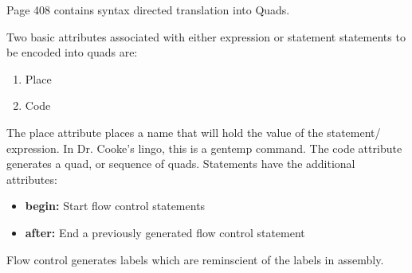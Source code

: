 Page 408 contains syntax directed translation into Quads.

Two basic attributes associated with either expression or statement statements to be encoded into quads are:
\begin{enumerate}
\item Place 
\item Code
\end{enumerate}
 The place attribute places a name that will hold the value of the statement/ expression.  In Dr. Cooke's lingo, this is a gentemp command.    The code attribute generates a quad, or sequence of quads.  
Statements have the additional attributes:
\begin{itemize}
\item \textbf{begin:}  Start flow control statements
\item \textbf{after:}   End a previously generated flow control statement
\end{itemize}
Flow control generates labels which are reminscient of the labels in assembly.  


